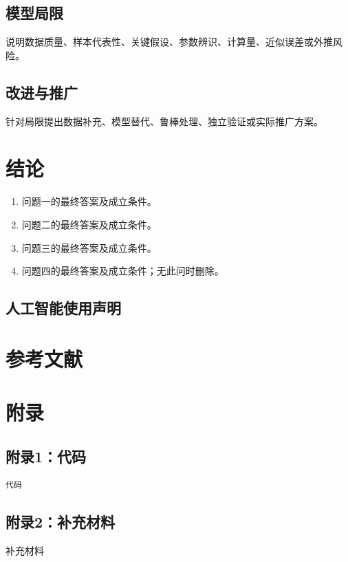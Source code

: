 \documentclass[UTF8,a4paper,12pt]{ctexart}
\newif\ifshowguide
\newcommand{\WriteGuide}[3]{%
  \ifshowguide
  \begin{quote}
    \small
    \textbf{写什么：}#1\par
    \textbf{怎么写：}#2\par
    \textbf{避免：}#3
  \end{quote}
  \fi
}
\begin{document}
\subsection{模型局限}
说明数据质量、样本代表性、关键假设、参数辨识、计算量、近似误差或外推风险。

\subsection{改进与推广}
针对局限提出数据补充、模型替代、鲁棒处理、独立验证或实际推广方案。

\section{结论}

\WriteGuide
  {按问题顺序汇总最终答案，并给出总体认识。}
  {每个小问使用一段或一条结论，保留决定性结果、成立条件和适用范围，不重新推导。}
  {加入正文没有的新结果；只写定性套话；摘要与结论不一致。}

\begin{enumerate}[label=\textbf{问题\chinese*：},leftmargin=5.5em]
  \item 问题一的最终答案及成立条件。
  \item 问题二的最终答案及成立条件。
  \item 问题三的最终答案及成立条件。
  \item 问题四的最终答案及成立条件；无此问时删除。
\end{enumerate}

\subsection{人工智能使用声明}

\section*{参考文献}

\section*{附录}

\subsection*{附录1：代码}
\begin{lstlisting}
代码
\end{lstlisting}

\subsection*{附录2：补充材料}
补充材料
\end{document}
